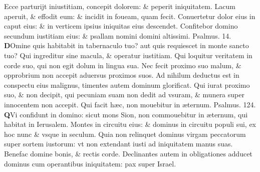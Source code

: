 \documentclass[a5paper,10pt]{book}
\def\ae{æ}
\begin{document}
\begin{multicols*}{2}
\newline \color{red} E\color{black}cce parturijt iniustitiam, concepit dolorem: \& peperit iniquitatem.
\newline \color{red} L\color{black}acum aperuit, \& effodit eum: \& incidit in foueam, quam fecit.
\newline \color{red} C\color{black}onuertetur dolor eius in caput eius: \& in verticem ipsius iniquitas eius descendet.
\newline \color{red} C\color{black}onfitebor domino secundum iustitiam eius: \& psallam nomini domini altissimi. \quad \color{red} Psalmus. \hypertarget{ps14}{14.} \color{black}
\vspace{-.5em}
\lettrine[lines=2]{\bfseries \color{red} D}{}Omine quis habitabit in tabernaculo tuo? aut quis requiescet in monte sancto tuo?
\newline \color{red} Q\color{black}ui ingreditur sine macula, \& operatur iustitiam.
\newline \color{red} Q\color{black}ui loquitur veritatem in corde suo, qui non egit dolum in lingua sua.
\newline \color{red} N\color{black}ec fecit proximo suo malum, \& opprobrium non accepit aduersus proximos suos.
\newline \color{red} A\color{black}d nihilum deductus est in conspectu eius malignus, timentes autem dominum glorificat.
\newline \color{red} Q\color{black}ui iurat proximo suo, \& non decipit, qui pecuniam suam non dedit ad vsuram, \& munera super innocentem non accepit.
\newline \color{red} Q\color{black}ui facit h\ae c, non mouebitur in \ae ternum. \quad \color{red} Psalmus. \hypertarget{ps124}{124.} \color{black}
\vspace{-.5em}
\lettrine[lines=2]{\bfseries \color{red} Q}{}Vi confidunt in domino: sicut mons Sion, non commouebitur in \ae ternum, qui habitat in Ierusalem.
\newline \color{red} M\color{black}ontes in circuitu eius: \& dominus in circuitu populi sui, ex hoc nunc \& vsque in seculum.
\newline \color{red} Q\color{black}uia non relinquet dominus virgam peccatorum super sortem iustorum: vt non extendant iusti ad iniquitatem manus suas.
\newline \color{red} B\color{black}enefac domine bonis, \& rectis corde.
\newline \color{red} D\color{black}eclinantes autem in obligationes adducet dominus cum operantibus iniquitatem: pax super Israel.

\end{multicols*}
\end{document}
